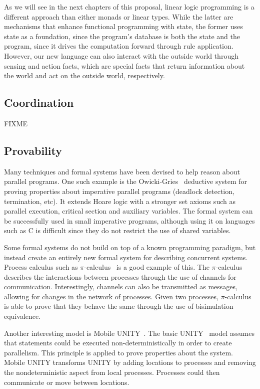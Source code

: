 As we will see in the next chapters of this proposal, linear logic programming is a different approach than either monads or linear types.
While the latter are mechanisms that enhance functional programming with state, the former uses state as a foundation, since
the program's database is both the state and the program, since it drives the computation forward through rule application. However, our
new language can also interact with the outside world through sensing and action facts, which are special facts that return information
about the world and act on the outside world, respectively.

\subsection{Coordination}

FIXME

\subsection{Provability}

Many techniques and formal systems have been devised to help reason about parallel programs.
One such example is the Owicki-Gries~\cite{Owicki:1976:VPP:360051.360224} deductive system
for proving properties about imperative parallel programs (deadlock detection, termination, etc).
It extends Hoare logic with a stronger set axioms such as parallel execution, critical section
and auxiliary variables. The formal system can be successfully used in small imperative
programs, although using it on languages such as C is difficult since they do not
restrict the use of shared variables.

Some formal systems do not build on top of a known programming paradigm, but instead
create an entirely new formal system for describing concurrent systems. Process calculus
such as $\pi$-calculus~\cite{Milner:1999:CMS:329902} is a good example of this.
The $\pi$-calculus describes the interactions between processes
through the use of channels for communication. Interestingly, channels can also be transmitted as
messages, allowing for changes in the network of processes.
Given two processes, $\pi$-calculus is able to prove that they behave the same through
the use of bisimulation equivalence.

Another interesting model is Mobile UNITY~\cite{Roman97anintroduction}. The basic UNITY~\cite{UNITY} model assumes that statements could be executed non-deterministically
in order to create parallelism. This principle is applied to prove properties about
the system.
Mobile UNITY transforms UNITY by adding locations to processes and removing the
nondeterministic aspect from local processes. Processes could then communicate or move
between locations.

